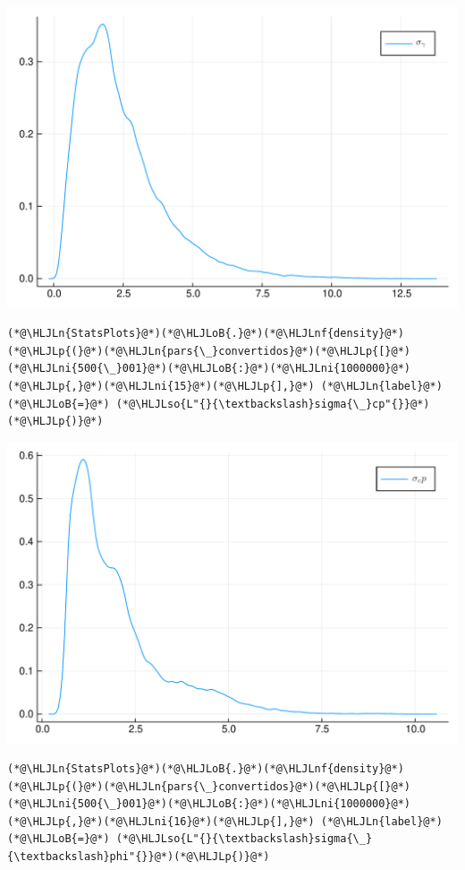 \documentclass[12pt,a4paper]{article}
\newcommand{\HLJLn}[1]{#1}
\newcommand{\HLJLnf}[1]{\textcolor[RGB]{66,102,213}{#1}}
\newcommand{\HLJLso}[1]{\textcolor[RGB]{201,61,57}{#1}}
\newcommand{\HLJLni}[1]{\textcolor[RGB]{59,151,46}{#1}}
\newcommand{\HLJLoB}[1]{\textcolor[RGB]{102,102,102}{\textbf{#1}}}
\newcommand{\HLJLp}[1]{#1}
\begin{document}
\includegraphics[width=\linewidth]{figures/carlos_mcmc_15_1.pdf}

\begin{lstlisting}
(*@\HLJLn{StatsPlots}@*)(*@\HLJLoB{.}@*)(*@\HLJLnf{density}@*)(*@\HLJLp{(}@*)(*@\HLJLn{pars{\_}convertidos}@*)(*@\HLJLp{[}@*)(*@\HLJLni{500{\_}001}@*)(*@\HLJLoB{:}@*)(*@\HLJLni{1000000}@*)(*@\HLJLp{,}@*)(*@\HLJLni{15}@*)(*@\HLJLp{],}@*) (*@\HLJLn{label}@*)(*@\HLJLoB{=}@*) (*@\HLJLso{L"{}{\textbackslash}sigma{\_}cp"{}}@*)(*@\HLJLp{)}@*)
\end{lstlisting}

\includegraphics[width=\linewidth]{figures/carlos_mcmc_16_1.pdf}

\begin{lstlisting}
(*@\HLJLn{StatsPlots}@*)(*@\HLJLoB{.}@*)(*@\HLJLnf{density}@*)(*@\HLJLp{(}@*)(*@\HLJLn{pars{\_}convertidos}@*)(*@\HLJLp{[}@*)(*@\HLJLni{500{\_}001}@*)(*@\HLJLoB{:}@*)(*@\HLJLni{1000000}@*)(*@\HLJLp{,}@*)(*@\HLJLni{16}@*)(*@\HLJLp{],}@*) (*@\HLJLn{label}@*)(*@\HLJLoB{=}@*) (*@\HLJLso{L"{}{\textbackslash}sigma{\_}{\textbackslash}phi"{}}@*)(*@\HLJLp{)}@*)
\end{lstlisting}
\end{document}

